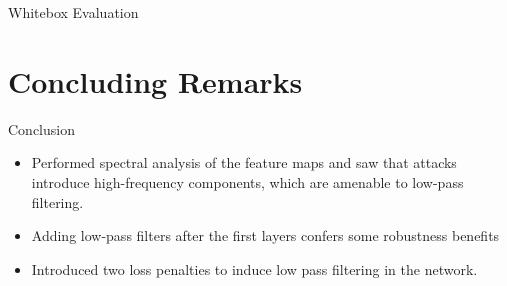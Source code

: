 \documentclass{beamer}
\begin{document}
\begin{frame}{Whitebox Evaluation}
	\begin{table}[t!]
	  \begin{center}
	    \caption{Results from white box evaluation}
	    \label{tab:table2}
	  \end{center}
	\end{table}
\end{frame}
\section{Concluding Remarks}
\begin{frame}{Conclusion}
\begin{itemize}
	\item Performed spectral analysis of the feature maps and saw that attacks introduce high-frequency components, which are amenable to low-pass filtering.
	\pause
	\item Adding low-pass filters after the first layers confers some robustness benefits
	\pause
	\item Introduced two loss penalties to induce low pass filtering in the network.
\end{itemize}
\end{frame}
\end{document}
